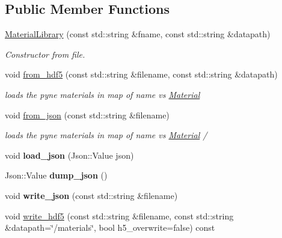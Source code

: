 \subsection*{Public Member Functions}
\begin{DoxyCompactItemize}
\item 
\hyperlink{classpyne_1_1_material_library_a38e307d9c8c2f6266cc0a5b2f8f81bc5}{Material\+Library} (const std\+::string \&fname, const std\+::string \&datapath)
\begin{DoxyCompactList}\small\item\em Constructor from file. \end{DoxyCompactList}\item 
void \hyperlink{classpyne_1_1_material_library_ae6e7c80567660b1dae6f1fcc30c31b83}{from\+\_\+hdf5} (const std\+::string \&filename, const std\+::string \&datapath)
\begin{DoxyCompactList}\small\item\em loads the pyne materials in map of name vs \hyperlink{classpyne_1_1_material}{Material} \end{DoxyCompactList}\item 
void \hyperlink{classpyne_1_1_material_library_aef44a4072ce57379d36798647f9b3c02}{from\+\_\+json} (const std\+::string \&filename)
\begin{DoxyCompactList}\small\item\em loads the pyne materials in map of name vs \hyperlink{classpyne_1_1_material}{Material} / \end{DoxyCompactList}\item 
\mbox{\label{classpyne_1_1_material_library_a0cf8c7a187dfcaf0ded4744515110be2}} 
void {\bfseries load\+\_\+json} (Json\+::\+Value json)
\item 
\mbox{\label{classpyne_1_1_material_library_a7c09faa38f4006e699ccd119f91852b5}} 
Json\+::\+Value {\bfseries dump\+\_\+json} ()
\item 
\mbox{\label{classpyne_1_1_material_library_a67279bc01566a0e5b2f0e42a9019fa94}} 
void {\bfseries write\+\_\+json} (const std\+::string \&filename)
\item 
void \hyperlink{classpyne_1_1_material_library_abd87cb634714069e4e1636d61484bab2}{write\+\_\+hdf5} (const std\+::string \&filename, const std\+::string \&datapath=\char`\"{}/materials\char`\"{}, bool h5\+\_\+overwrite=false) const

\end{DoxyCompactItemize}
